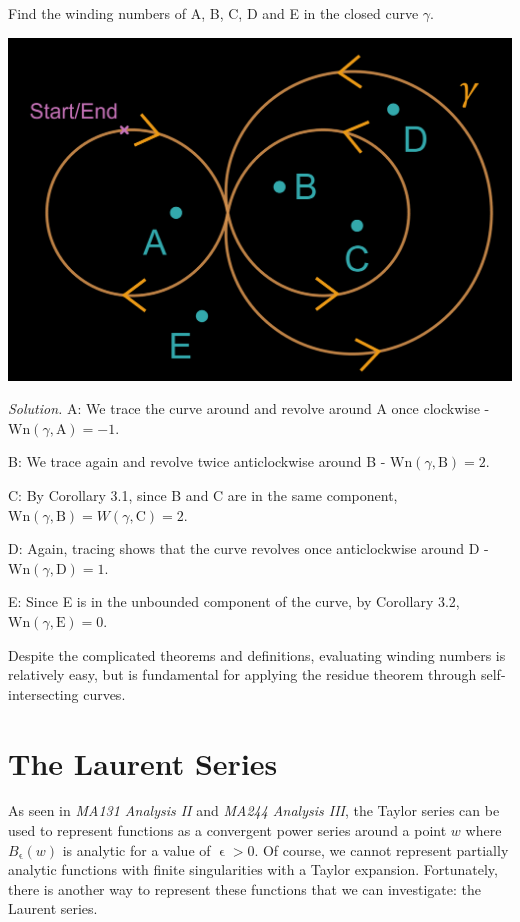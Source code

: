 \documentclass[a4paper]{article}
\def\Wind{\text{Wn}}
\begin{document}
\begin{example}{}{}
Find the winding numbers of A, B, C, D and E in the closed curve $\gamma$.

\begin{center}
\includegraphics[scale=0.13]{windingnumbers}
\end{center}
\end{example} 

\noindent\textit{Solution.}
A: We trace the curve around and revolve around A once clockwise - $\Wind (\gamma,\text{A})=-1$.

B: We trace again and revolve twice anticlockwise around B  - $\Wind(\gamma,\text{B})=2$.

C: By Corollary 3.1, since B and C are in the same component, $\Wind (\gamma,\text{B})=W(\gamma,\text{C})=2$.

D: Again, tracing shows that the curve revolves once anticlockwise around D - $\Wind (\gamma,\text{D})=1$.

E: Since E is in the unbounded component of the curve, by Corollary 3.2, $\Wind(\gamma,\text{E})=0$.


Despite the complicated theorems and definitions, evaluating winding numbers is relatively easy, but is fundamental for applying the residue theorem through self-intersecting curves.

\newpage
\section{The Laurent Series}

As seen in \textit{MA131 Analysis II} and \textit{MA244 Analysis III}, the Taylor series can be used to represent functions as a convergent power series around a point $w$ where $B_{\upvarepsilon}(w)$ is analytic for a value of $\upvarepsilon>0$. Of course, we cannot represent partially analytic functions with finite singularities with a Taylor expansion. Fortunately, there is another way to represent these functions that we can investigate: the Laurent series. 
\end{document}
